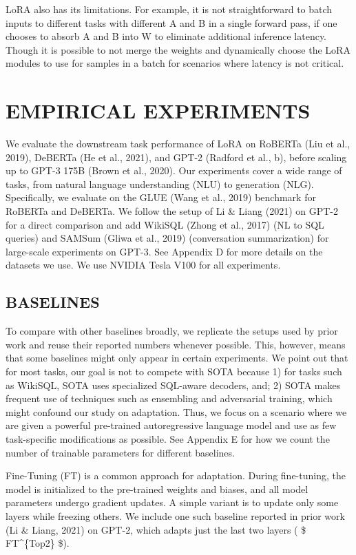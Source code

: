 \documentclass[conference]{IEEEtran}
\begin{document}
LoRA also has its limitations. For example, it is not straightforward to batch inputs to different tasks with different A and B in a single forward pass, if one chooses to absorb A and B into W to eliminate additional inference latency. Though it is possible to not merge the weights and dynamically choose the LoRA modules to use for samples in a batch for scenarios where latency is not critical.




\section{EMPIRICAL EXPERIMENTS}

We evaluate the downstream task performance of LoRA on RoBERTa (Liu et al., 2019), DeBERTa (He et al., 2021), and GPT-2 (Radford et al., b), before scaling up to GPT-3 175B (Brown et al., 2020). Our experiments cover a wide range of tasks, from natural language understanding (NLU) to generation (NLG). Specifically, we evaluate on the GLUE (Wang et al., 2019) benchmark for RoBERTa and DeBERTa. We follow the setup of Li \& Liang (2021) on GPT-2 for a direct comparison and add WikiSQL (Zhong et al., 2017) (NL to SQL queries) and SAMSum (Gliwa et al., 2019) (conversation summarization) for large-scale experiments on GPT-3. See Appendix D for more details on the datasets we use. We use NVIDIA Tesla V100 for all experiments.




\subsection{BASELINES}

To compare with other baselines broadly, we replicate the setups used by prior work and reuse their reported numbers whenever possible. This, however, means that some baselines might only appear in certain experiments. We point out that for most tasks, our goal is not to compete with SOTA because 1) for tasks such as WikiSQL, SOTA uses specialized SQL-aware decoders, and; 2) SOTA makes frequent use of techniques such as ensembling and adversarial training, which might confound our study on adaptation. Thus, we focus on a scenario where we are given a powerful pre-trained autoregressive language model and use as few task-specific modifications as possible. See Appendix E for how we count the number of trainable parameters for different baselines.

Fine-Tuning (FT) is a common approach for adaptation. During fine-tuning, the model is initialized to the pre-trained weights and biases, and all model parameters undergo gradient updates. A simple variant is to update only some layers while freezing others. We include one such baseline reported in prior work (Li \& Liang, 2021) on GPT-2, which adapts just the last two layers ( \$ FT\textasciicircum{}\{Top2\} \$).
\end{document}
